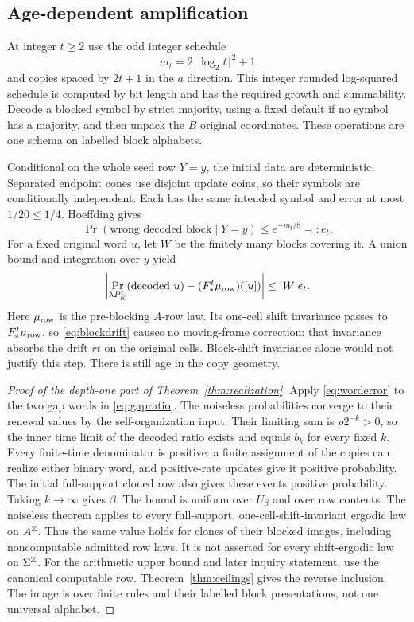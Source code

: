 \subsection{Age-dependent amplification}
At integer $t\geq2$ use the odd integer schedule
\[
 m_t=2\lceil\log_2t\rceil^2+1
\]
and copies spaced by $2t+1$ in the $a$ direction. This integer
rounded log-squared schedule is computed by bit length and has
the required growth and summability. Decode a blocked symbol by
strict majority, using a fixed default if no symbol has a majority,
and then unpack the $B$ original coordinates. These operations are
one schema on labelled block alphabets.

Conditional on the whole seed row $Y=y$, the initial data are
deterministic. Separated endpoint cones use disjoint update coins,
so their symbols are conditionally independent. Each has the same
intended symbol and error at most $1/20\leq1/4$. Hoeffding gives
\begin{equation}\label{eq:age-error}
 \Pr(\text{wrong decoded block}\mid Y=y)\leq e^{-m_t/8}=:e_t.
\end{equation}
For a fixed original word $u$, let $W$ be the finitely many
blocks covering it. A union bound and integration over $y$ yield
\begin{equation}\label{eq:worderror}
 \left|\Pr_{\lambda P_K^t}(\text{decoded }u)
                      -(F_*^t\mu_{\rm row})([u])\right|\leq |W|e_t.
\end{equation}
Here $\mu_{\rm row}$ is the pre-blocking $A$-row law.
Its one-cell shift invariance passes to $F_*^t\mu_{\rm row}$,
so \eqref{eq:blockdrift} causes no moving-frame correction:
that invariance absorbs the drift $rt$ on the original cells.
Block-shift invariance alone would not justify this step.
There is still age in the copy geometry.

\begin{proof}[Proof of the depth-one part of Theorem~\ref{thm:realization}]
Apply \eqref{eq:worderror} to the two gap words in
\eqref{eq:gapratio}. The noiseless probabilities converge to
their renewal values by the self-organization input. Their
limiting sum is $\rho2^{-k}>0$, so the inner time limit of the
decoded ratio exists and equals $b_k$ for every fixed $k$.
Every finite-time denominator is positive: a finite assignment of
the copies can realize either binary word, and positive-rate
updates give it positive probability. The initial full-support
cloned row also gives these events positive probability.
Taking $k\to\infty$ gives $\beta$. The bound is uniform over
$U_\beta$ and over row contents. The noiseless theorem applies to every full-support,
one-cell-shift-invariant ergodic law on $A^\mathbb Z$. Thus the same
value holds for clones of their blocked images, including
noncomputable admitted row laws. It is not asserted for every
shift-ergodic law on $\Sigma^\mathbb Z$. For the
arithmetic upper bound and later inquiry statement, use the
canonical computable row. Theorem~\ref{thm:ceilings} gives the
reverse inclusion. The image is over finite rules and their
labelled block presentations, not one universal alphabet.
\end{proof}

